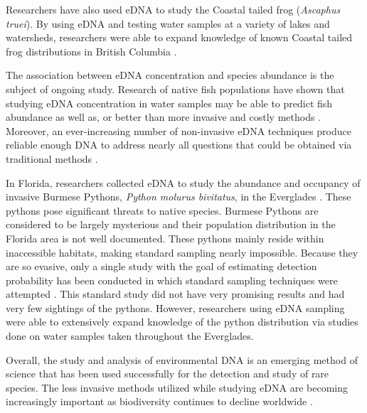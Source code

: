     
\vspace{5mm}


Researchers have also used eDNA to study the Coastal tailed frog (\textit{Ascaphus truei}). By using eDNA and testing water samples at a variety of lakes and watersheds, researchers were able to expand knowledge of known Coastal tailed frog distributions in British Columbia \citep{forestry}.

    \vspace{5mm}

The association between eDNA concentration and species abundance is the subject of ongoing study. Research of native fish populations have shown that studying eDNA concentration in water samples may be able to predict fish abundance as well as, or better than more invasive and costly methods \citep{fishabundance,salmonabundance}. Moreover, an ever-increasing number of non-invasive eDNA techniques produce reliable enough DNA to address nearly all questions that could be obtained via traditional methods \citep{ecounderstanding}.
\vspace{5mm}

In Florida, researchers collected eDNA to study the abundance and occupancy of invasive Burmese Pythons, \textit{Python molurus bivitatus}, in the Everglades \citep{pythons}. These pythons pose significant threats to native species.  Burmese Pythons are considered to  be largely mysterious and their population distribution in the Florida area is not well documented. These pythons mainly reside within inaccessible habitats, making standard sampling nearly impossible. Because they are so evasive, only a single study with the goal of estimating detection probability has been conducted in which standard sampling techniques were attempted \citep{standardPython}.  This standard study did not have very promising results and had very few sightings of the pythons. However, researchers using eDNA sampling were able to extensively expand knowledge of the python distribution via studies done on water samples taken throughout the Everglades. 

 \vspace{5mm}
Overall, the study and analysis of environmental DNA is an emerging method of science that has been used successfully for the detection and study of rare species. The less invasive methods utilized while studying eDNA are becoming increasingly important as biodiversity continues to decline worldwide \citep{GreenSturgeon}.

\vspace{5mm}

